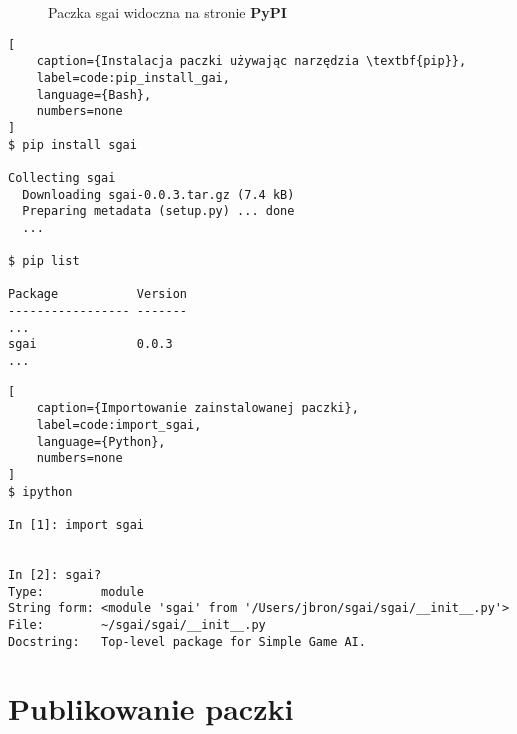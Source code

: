 \begin{figure}[h]
    \centering
    \caption{Paczka sgai widoczna na stronie \textbf{PyPI}}
    \label{img:sgai_on_pypi}
\end{figure}




\begin{onepage}
    \begin{lstlisting}[
    caption={Instalacja paczki używając narzędzia \textbf{pip}},
    label=code:pip_install_gai,
    language={Bash},
    numbers=none
]
$ pip install sgai

Collecting sgai
  Downloading sgai-0.0.3.tar.gz (7.4 kB)
  Preparing metadata (setup.py) ... done
  ...

$ pip list

Package           Version
----------------- -------
...
sgai              0.0.3
...
\end{lstlisting}
\end{onepage}



\begin{onepage}
    \begin{lstlisting}[
    caption={Importowanie zainstalowanej paczki},
    label=code:import_sgai,
    language={Python},
    numbers=none
]
$ ipython

In [1]: import sgai


In [2]: sgai?
Type:        module
String form: <module 'sgai' from '/Users/jbron/sgai/sgai/__init__.py'>
File:        ~/sgai/sgai/__init__.py
Docstring:   Top-level package for Simple Game AI.

\end{lstlisting}
\end{onepage}






\section{Publikowanie paczki}
